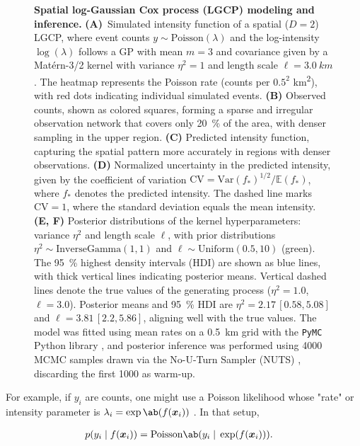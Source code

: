 \begin{figure}
    \caption[Spatial log-Gaussian Cox process (LGCP) modeling and inference.]{\textbf{Spatial log-Gaussian Cox process (LGCP) modeling and inference.} \textbf{(A)}~Simulated intensity function of a spatial ($D=2$) LGCP, where event counts $ y \sim \text{Poisson}(\lambda) $ and the log-intensity $ \log(\lambda) $ follows a GP with mean $ m = 3 $ and covariance given by a Matérn-3/2 kernel with variance $ \eta^2 = 1 $ and length scale $ \ell = \qty{3.0}{km} $. The heatmap represents the Poisson rate (counts per $0.5^2$ \unit{km^2}), with red dots indicating individual simulated events. \textbf{(B)} Observed counts, shown as colored squares, forming a sparse and irregular observation network that covers only \qty{20}{\percent} of the area, with denser sampling in the upper region. \textbf{(C)} Predicted intensity function, capturing the spatial pattern more accurately in regions with denser observations. \textbf{(D)} Normalized uncertainty in the predicted intensity, given by the coefficient of variation $\text{CV} = \mathrm{Var}(f_*)^{1/2} / \mathbb{E}(f_*)$, where $f_*$ denotes the predicted intensity. The dashed line marks $\text{CV} = 1$, where the standard deviation equals the mean intensity. \textbf{(E, F)} Posterior distributions of the kernel hyperparameters: variance $ \eta^2$ and length scale $ \ell $, with prior distributions $ \eta^2 \sim \text{InverseGamma}(1, 1) $ and $ \ell \sim \text{Uniform}(0.5, 10) $ (green). The \qty{95}{\percent} highest density intervals (HDI) are shown as blue lines, with thick vertical lines indicating posterior means. Vertical dashed lines denote the true values of the generating process ($ \eta^2 = 1.0 $, $ \ell = 3.0 $). Posterior means and \qty{95}{\percent} HDI are $ \eta^2 = 2.17 \, [0.58, 5.08]$ and $ \ell = 3.81 \, [2.2, 5.86] $, aligning well with the true values. The model was fitted using mean rates on a \qty{0.5}{km} grid with the \texttt{PyMC} Python library \cite{abril-pla_pymc_2023}, and posterior inference was performed using \num{4000} MCMC samples drawn via the No-U-Turn Sampler (NUTS) \cite{hoffman_no-u-turn_2014}, discarding the first \num{1000} as warm-up.}
    \label{fig:theory:lgcp}
\end{figure}


For example, if $y_i$ are counts, one might use a Poisson likelihood whose "rate" or intensity parameter is $\lambda_i = \exp\ab(f(\bm{x}_i))$ \cite[cf.][Section~6.5]{diggle_statistical_2013}. In that setup,

\begin{align}
    p(y_i \; | \; f(\bm{x}_i)) &= \text{Poisson}\ab( y_i \; | \; \exp(f(\bm{x}_i)) ).
\end{align}


